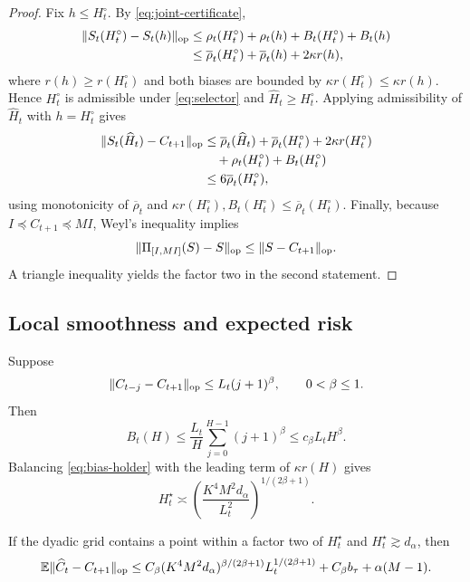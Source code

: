 \begin{proof}
Fix $h\le H_t^\circ$.  By \eqref{eq:joint-certificate},
\begin{align}
 \|S_t(H_t^\circ)-S_t(h)\|_{\mathrm{op}}
 &\le\rho_t(H_t^\circ)+\rho_t(h)+B_t(H_t^\circ)+B_t(h)\\
 &\le\overline\rho_t(H_t^\circ)+\overline\rho_t(h)+2\kappa r(h),
\end{align}
where $r(h)\ge r(H_t^\circ)$ and both biases are bounded by $\kappa r(H_t^\circ)\le\kappa r(h)$.  Hence $H_t^\circ$ is admissible under \eqref{eq:selector} and $\widehat H_t\ge H_t^\circ$.  Applying admissibility of $\widehat H_t$ with $h=H_t^\circ$ gives
\begin{align}
 \|S_t(\widehat H_t)-C_{t+1}\|_{\mathrm{op}}
 &\le\overline\rho_t(\widehat H_t)+\overline\rho_t(H_t^\circ)+2\kappa r(H_t^\circ)\\
 &\quad+\rho_t(H_t^\circ)+B_t(H_t^\circ)\\
 &\le6\overline\rho_t(H_t^\circ),
\end{align}
using monotonicity of $\overline\rho_t$ and $\kappa r(H_t^\circ),B_t(H_t^\circ)\le\overline\rho_t(H_t^\circ)$.  Finally, because $I\preceq C_{t+1}\preceq MI$, Weyl's inequality implies
\begin{equation}
 \|\Pi_{[I,MI]}(S)-S\|_{\mathrm{op}}\le\|S-C_{t+1}\|_{\mathrm{op}}.
\end{equation}
A triangle inequality yields the factor two in the second statement.  \end{proof}

\subsection{Local smoothness and expected risk}

Suppose
\begin{equation}
 \|C_{t-j}-C_{t+1}\|_{\mathrm{op}}\le L_t(j+1)^\beta,
 \qquad 0<\beta\le1.
 \label{eq:holder-app}
\end{equation}
Then
\begin{equation}
 B_t(H)\le\frac{L_t}{H}\sum_{j=0}^{H-1}(j+1)^\beta
 \le c_\beta L_tH^\beta.
 \label{eq:bias-holder}
\end{equation}
Balancing \eqref{eq:bias-holder} with the leading term of $\kappa r(H)$ gives
\begin{equation}
 H_t^\star\asymp\left(\frac{K^4M^2d_\alpha}{L_t^2}\right)^{1/(2\beta+1)}.
\end{equation}

\begin{corollary}
\label{cor:rate-app}
If the dyadic grid contains a point within a factor two of $H_t^\star$ and $H_t^\star\gtrsim d_\alpha$, then
\begin{equation}
 \mathbb E\|\widehat C_t-C_{t+1}\|_{\mathrm{op}}
 \le C_\beta(K^4M^2d_\alpha)^{\beta/(2\beta+1)}L_t^{1/(2\beta+1)}
 +C_\beta b_\tau+\alpha(M-1).
 \label{eq:expected-upper-app}
\end{equation}
\end{corollary}

